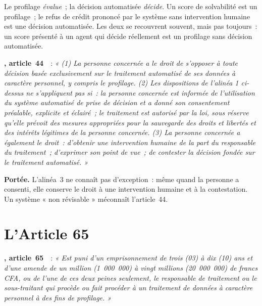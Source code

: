 Le profilage \textit{évalue}~; la décision automatisée \textit{décide}. Un
score de solvabilité est un profilage~; le refus de crédit prononcé par le
système sans intervention humaine est une décision automatisée. Les deux se
recouvrent souvent, mais pas toujours~: un score présenté à un agent qui
décide réellement est un profilage sans décision automatisée.

\begin{boxjuris}
\textbf{, article~44}~\cite{loi2024017}~:
\textit{« (1) La personne concernée a le droit de s'opposer à toute décision
basée exclusivement sur le traitement automatisé de ses données à
caractère personnel, y compris le profilage. (2) Les dispositions de
l'alinéa 1 ci-dessus ne s'appliquent pas si~: la personne concernée est
informée de l'utilisation du système automatisé de prise de décision et a
donné son consentement préalable, explicite et éclairé~; le traitement est
autorisé par la loi, sous réserve qu'elle prévoit des mesures appropriées
pour la sauvegarde des droits et libertés et des intérêts légitimes de la
personne concernée. (3) La personne concernée a également le droit~:
d'obtenir une intervention humaine de la part du responsable du
traitement~; d'exprimer son point de vue~; de contester la décision fondée
sur le traitement automatisé. »}

\smallskip
\textbf{Portée.} L'alinéa~3 ne connaît pas d'exception~: même quand la
personne a consenti, elle conserve le droit à une intervention humaine et
à la contestation. Un système « non révisable » méconnaît l'article~44.
\end{boxjuris}

\section{L'Article 65}
\label{sec:c14-article65}

\begin{boxjuris}
\textbf{, article~65}~\cite{loi2024017}~:
\textit{« Est puni d'un emprisonnement de trois (03) à dix (10) ans et
d'une amende de un million (1~000~000) à vingt millions (20~000~000) de
francs CFA, ou de l'une de ces deux peines seulement, le responsable de
traitement ou le sous-traitant qui procède ou fait procéder à un
traitement de données à caractère personnel à des fins de profilage. »}
\end{boxjuris}

